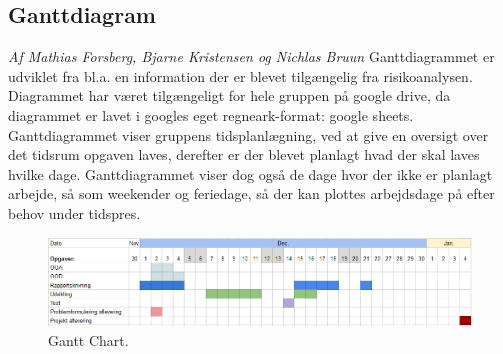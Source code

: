 \subsection{Ganttdiagram}
\textit{Af Mathias Forsberg, Bjarne Kristensen og Nichlas Bruun}\newline
Ganttdiagrammet er udviklet fra bl.a. en information der er blevet tilgængelig fra risikoanalysen. Diagrammet har været tilgængeligt for hele gruppen på google drive, da diagrammet er lavet i googles eget regneark-format: google sheets. Ganttdiagrammet viser gruppens tidsplanlægning, ved at give en oversigt over det tidsrum opgaven laves, derefter er der blevet planlagt hvad der skal laves hvilke dage. Ganttdiagrammet viser dog også de dage hvor der ikke er planlagt arbejde, så som weekender og feriedage, så der kan plottes arbejdsdage på efter behov under tidspres.

\begin{figure}
	\begin{center}
		\caption{Gantt Chart.}
		\label{dia:ganttpre}
		\includegraphics[width=1\linewidth]{pictures/up/ganttpre}
	\end{center}
\end{figure}

